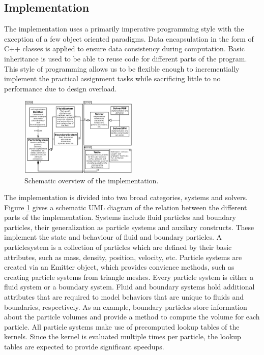 \documentclass[11pt, letterpaper, twocolumn]{article}
\begin{document}


\subsection{Implementation}
The implementation uses a primarily imperative programming style with the exception of a few object oriented paradigms. Data encapsulation in the form of C++ classes is applied to ensure data consistency during computation. Basic inheritance is used to be able to reuse code for different parts of the program. This style of programming allows us to be flexible enough to incrementially implement the practical assignment tasks while sacrificing little to no performance due to design overload.
\begin{figure}[ht]
    \centering
    \includegraphics[width=0.5\textwidth]{images/system.pdf}
    \caption{Schematic overview of the implementation.}
    \label{fig:systemuml}
\end{figure}

The implementation is divided into two broad categories, systems and solvers. Figure \ref{fig:systemuml} gives a schematic UML diagram of the relation between the different parts of the implementation.
Systems include fluid particles and boundary particles, their generalization as particle systems and auxilary constructs. These implement the state and behaviour of fluid and boundary particles. A particlesystem is a collection of particles which are defined by their basic attributes, such as mass, density, position, velocity, etc. Particle systems are created via an Emitter object, which provides convience methods, such as creating particle systems from triangle meshes.
Every particle system is either a fluid system or a boundary system. Fluid and boundary systems hold additional attributes that are required to model behaviors that are unique to fluids and boundaries, respectively. As an example, boundary particles store information about the particle volumes and provide a method to compute the volume for each particle. All particle systems make use of precomputed lookup tables of the kernels. Since the kernel is evaluated multiple times per particle, the lookup tables are expected to provide significant speedups.
\end{document}
